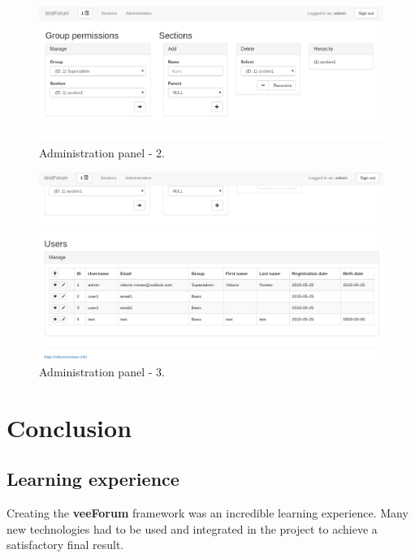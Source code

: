 \documentclass[12pt]{report}
\renewcommand\emph{\textbf}
\begin{document}
            \begin{figure}[!htb]
            \caption{Administration panel - 2.}
            \centering
            \includegraphics[width=1\textwidth]{u/9}
            \end{figure}

            \begin{figure}[!htb]
            \caption{Administration panel - 3.}
            \centering
            \includegraphics[width=1\textwidth]{u/10}
            \end{figure}


    \part{Conclusion}
        \chapter{Learning experience}

            Creating the \emph{veeForum} framework was an incredible learning experience. Many new technologies had to be used and integrated in the project to achieve a satisfactory final result.
\end{document}
